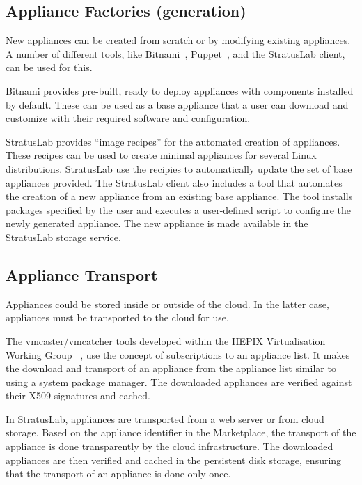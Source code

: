 \subsection{Appliance Factories (generation)}

New appliances can be created from scratch or by modifying existing appliances.
A number of different tools, like Bitnami~\cite{bitnami}, Puppet~\cite{puppet}, and the StratusLab client,
can be used for this.

Bitnami provides pre-built, ready to deploy appliances with components installed by default.
These can be used as a base appliance that a user can download and customize with their 
required software and configuration.

StratusLab provides ``image recipes'' for the automated creation of appliances. 
These recipes can be used to create minimal appliances for several
Linux distributions. StratusLab use the recipies to automatically update 
the set of base appliances provided. The StratusLab client also includes a tool that  
automates the creation of a new appliance from an existing base appliance.
The tool installs packages specified by the user and executes a user-defined  
script to configure the newly generated appliance. The new appliance is made available 
in the StratusLab storage service.

\subsection{Appliance Transport}

Appliances could be stored inside or outside of the cloud. In the latter case, 
appliances must be transported to the cloud for use.

The vmcaster/vmcatcher tools developed within the HEPIX Virtualisation Working
Group ~\cite{hepixbooktransfer}, use the concept of subscriptions to an 
appliance list. It makes the download and transport of an appliance 
from the appliance list similar to using a system package manager.
The downloaded appliances are
verified against their X509 signatures and cached.

In StratusLab, appliances are transported from a web
server or from cloud storage. Based on the appliance identifier in the Marketplace,
the transport of the appliance is done transparently by the cloud infrastructure.
The downloaded appliances are then verified and cached in the persistent disk storage,
ensuring that the transport of an appliance is done only once.

